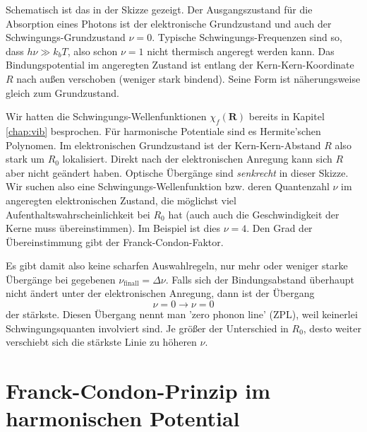 Schematisch ist das in der Skizze gezeigt. Der Ausgangszustand für die Absorption eines Photons ist der elektronische Grundzustand und auch der Schwingungs-Grundzustand $\nu = 0$. Typische Schwingungs-Frequenzen sind so, dass $h \nu \gg k_b T$, also schon $\nu =1$ nicht thermisch angeregt werden kann. Das Bindungspotential im angeregten Zustand ist entlang der Kern-Kern-Koordinate $R$ nach außen verschoben (weniger stark bindend). Seine Form ist näherungsweise gleich zum Grundzustand. 

Wir hatten die Schwingungs-Wellenfunktionen $\chi_f(\mathbf{R})$ bereits in Kapitel \ref{chap:vib} besprochen. Für harmonische Potentiale sind es Hermite'schen Polynomen. Im elektronischen Grundzustand ist der Kern-Kern-Abstand $R$ also stark um $R_0$ lokalisiert. Direkt nach der elektronischen Anregung kann sich $R$ aber nicht geändert haben. Optische Übergänge sind \emph{senkrecht} in dieser Skizze. Wir suchen also eine Schwingungs-Wellenfunktion bzw. deren Quantenzahl $\nu$ im angeregten elektronischen Zustand, die möglichst viel Aufenthaltswahrscheinlichkeit bei $R_0$ hat (auch auch die Geschwindigkeit der Kerne muss übereinstimmen). Im Beispiel ist dies $\nu = 4$. Den Grad der Übereinstimmung gibt der Franck-Condon-Faktor.

Es gibt damit also keine scharfen Auswahlregeln, nur mehr oder weniger starke Übergänge bei gegebenen $\nu_\text{finall}  = \Delta \nu$. Falls sich der Bindungsabstand überhaupt nicht ändert unter der elektronischen Anregung, dann ist der Übergang
\begin{equation}
 \nu = 0 \rightarrow \nu = 0
\end{equation}
der stärkste. Diesen Übergang nennt man 'zero phonon line' (ZPL), weil keinerlei Schwingungsquanten involviert sind. Je größer der Unterschied in $R_0$, desto weiter verschiebt sich die stärkste Linie zu höheren $\nu$. 



\section{Franck-Condon-Prinzip im harmonischen Potential}

